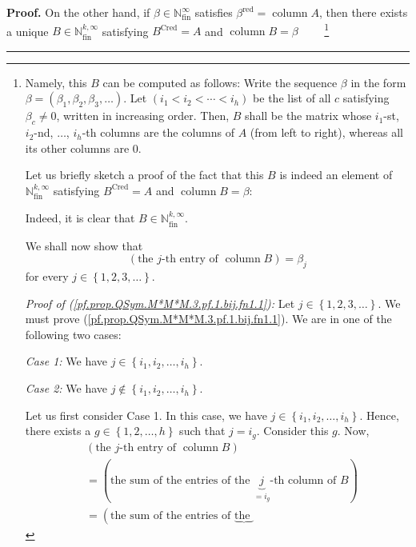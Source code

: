 \documentclass
[numbers=enddot,12pt,final,onecolumn,notitlepage,abstracton]{scrartcl}%
\theoremstyle{definition}
\newenvironment{proof}[1][Proof]{\noindent\textbf{#1.} }{\ \rule{0.5em}{0.5em}}
\begin{document}
\begin{proof}
On the other hand, if $\beta\in\mathbb{N}_{\operatorname*{fin}}^{\infty}$
satisfies $\beta^{\operatorname*{red}}=\operatorname*{column}A$, then there
exists a unique $B\in\mathbb{N}_{\operatorname*{fin}}^{k,\infty}$ satisfying
$B^{\operatorname*{Cred}}=A$ and $\operatorname*{column}B=\beta$%
\ \ \ \ \footnote{Namely, this $B$ can be computed as follows: Write the
sequence $\beta$ in the form $\beta=\left(  \beta_{1},\beta_{2},\beta
_{3},\ldots\right)  $. Let $\left(  i_{1}<i_{2}<\cdots<i_{h}\right)  $ be the
list of all $c$ satisfying $\beta_{c}\neq0$, written in increasing order.
Then, $B$ shall be the matrix whose $i_{1}$-st, $i_{2}$-nd, $\ldots$, $i_{h}%
$-th columns are the columns of $A$ (from left to right), whereas all its
other columns are $0$.
\par
Let us briefly sketch a proof of the fact that this $B$ is indeed an element
of $\mathbb{N}_{\operatorname*{fin}}^{k,\infty}$ satisfying
$B^{\operatorname*{Cred}}=A$ and $\operatorname*{column}B=\beta$:
\par
Indeed, it is clear that $B\in\mathbb{N}_{\operatorname*{fin}}^{k,\infty}$.
\par
We shall now show that%
\begin{equation}
\left(  \text{the }j\text{-th entry of }\operatorname*{column}B\right)
=\beta_{j} \label{pf.prop.QSym.M*M*M.3.pf.1.bij.fn1.1}%
\end{equation}
for every $j\in\left\{  1,2,3,\ldots\right\}  $.
\par
\textit{Proof of (\ref{pf.prop.QSym.M*M*M.3.pf.1.bij.fn1.1}):} Let
$j\in\left\{  1,2,3,\ldots\right\}  $. We must prove
(\ref{pf.prop.QSym.M*M*M.3.pf.1.bij.fn1.1}). We are in one of the following
two cases:
\par
\textit{Case 1:} We have $j\in\left\{  i_{1},i_{2},\ldots,i_{h}\right\}  $.
\par
\textit{Case 2:} We have $j\notin\left\{  i_{1},i_{2},\ldots,i_{h}\right\}  $.
\par
Let us first consider Case 1. In this case, we have $j\in\left\{  i_{1}%
,i_{2},\ldots,i_{h}\right\}  $. Hence, there exists a $g\in\left\{
1,2,\ldots,h\right\}  $ such that $j=i_{g}$. Consider this $g$. Now,
\begin{align*}
&  \left(  \text{the }j\text{-th entry of }\operatorname*{column}B\right) \\
&  =\left(  \text{the sum of the entries of the }\underbrace{j}_{=i_{g}%
}\text{-th column of }B\right) \\
&  =\left(  \text{the sum of the entries of }\underbrace{\text{the }%
}
\end{align*}}
\end{proof}
\end{document}
